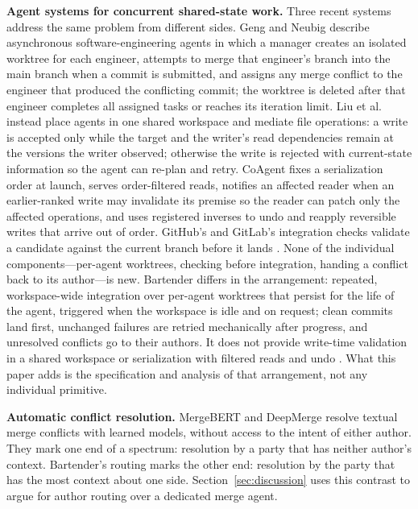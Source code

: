 \documentclass[pdflatex,sn-mathphys-ay]{sn-jnl}
\theoremstyle{thmstyleone}
\theoremstyle{thmstylethree}
\begin{document}
\textbf{Agent systems for concurrent shared-state work.} Three recent systems address the same problem from different sides. Geng and Neubig \citep{geng2026-asynchronous} describe asynchronous software-engineering agents in which a manager creates an isolated worktree for each engineer, attempts to merge that engineer's branch into the main branch when a commit is submitted, and assigns any merge conflict to the engineer that produced the conflicting commit; the worktree is deleted after that engineer completes all assigned tasks or reaches its iteration limit. Liu et al.~\citep{liu2026-state-management} instead place agents in one shared workspace and mediate file operations: a write is accepted only while the target and the writer's read dependencies remain at the versions the writer observed; otherwise the write is rejected with current-state information so the agent can re-plan and retry. CoAgent \citep{lyu2026-coagent} fixes a serialization order at launch, serves order-filtered reads, notifies an affected reader when an earlier-ranked write may invalidate its premise so the reader can patch only the affected operations, and uses registered inverses to undo and reapply reversible writes that arrive out of order. GitHub's and GitLab's integration checks validate a candidate against the current branch before it lands \citep{github-merge-queue,gitlab-merge-trains}. None of the individual components---per-agent worktrees, checking before integration, handing a conflict back to its author---is new. Bartender differs in the arrangement: repeated, workspace-wide integration over per-agent worktrees that persist for the life of the agent, triggered when the workspace is idle and on request; clean commits land first, unchanged failures are retried mechanically after progress, and unresolved conflicts go to their authors. It does not provide write-time validation in a shared workspace \citep{liu2026-state-management} or serialization with filtered reads and undo \citep{lyu2026-coagent}. What this paper adds is the specification and analysis of that arrangement, not any individual primitive.

\textbf{Automatic conflict resolution.} MergeBERT \citep{svyatkovskiy2022-transformers} and DeepMerge \citep{dinella2023-deepmerge} resolve textual merge conflicts with learned models, without access to the intent of either author. They mark one end of a spectrum: resolution by a party that has neither author's context. Bartender's routing marks the other end: resolution by the party that has the most context about one side. Section~\ref{sec:discussion} uses this contrast to argue for author routing over a dedicated merge agent.
\end{document}
